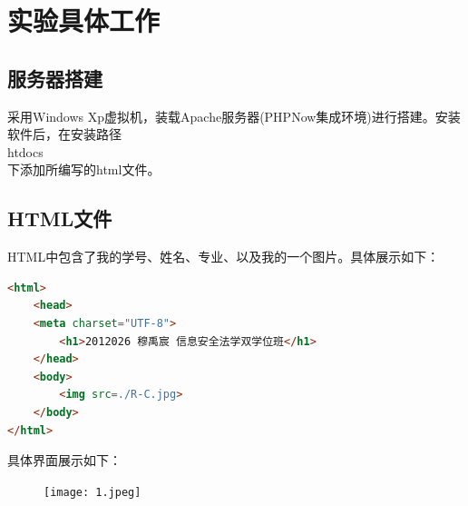 \documentclass[UTF8,a4paper,10pt]{ctexart}
\begin{document}
\section{实验具体工作}
\subsection{服务器搭建}
采用Windows Xp虚拟机，装载Apache服务器(PHPNow集成环境)进行搭建。安装软件后，在安装路径\\htdocs\\下添加所编写的html文件。

\subsection{HTML文件}
HTML中包含了我的学号、姓名、专业、以及我的一个图片。具体展示如下：
\begin{lstlisting}[frame=trbl,language={html}]
<html>
    <head>
	<meta charset="UTF-8">
        <h1>2012026 穆禹宸 信息安全法学双学位班</h1>
    </head>
    <body>
    	<img src=./R-C.jpg>
    </body>
</html>
\end{lstlisting}

具体界面展示如下：
\begin{figure}[H]
    \centering
    \texttt{[image: 1.jpeg]}
    \label{fig:1}
\end{figure}
\end{document}
